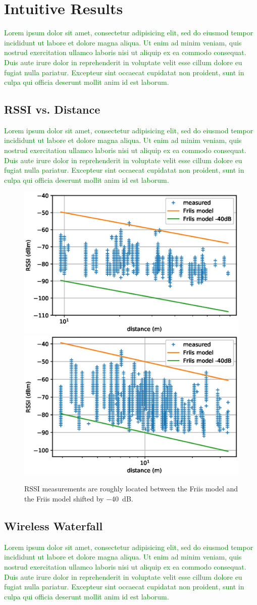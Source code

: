 \documentclass{elsarticle}
\newcommand{\lorem}          {\textcolor{green}{Lorem ipsum dolor sit amet, consectetur adipisicing elit, sed do eiusmod tempor incididunt ut labore et dolore magna aliqua. Ut enim ad minim veniam, quis nostrud exercitation ullamco laboris nisi ut aliquip ex ea commodo consequat. Duis aute irure dolor in reprehenderit in voluptate velit esse cillum dolore eu fugiat nulla pariatur. Excepteur sint occaecat cupidatat non proident, sunt in culpa qui officia deserunt mollit anim id est laborum.}}
\begin{document}
\section{Intuitive Results}
\label{sec:intuitive}

\lorem

\subsection{RSSI vs. Distance}
\label{sec:rssi_distance}

\lorem

\begin{figure}[h]
    \includegraphics[width=0.5\columnwidth]{pister_hack_peach.eps}
    \includegraphics[width=0.5\columnwidth]{pister_hack.eps}
    \caption{RSSI measurements are roughly located between the Friis model and the Friis model shifted by $-$40~dB.}
    \label{fig:pister_hack}
\end{figure}

\subsection{Wireless Waterfall}
\label{sec:waterfall}


\lorem

\end{document}
